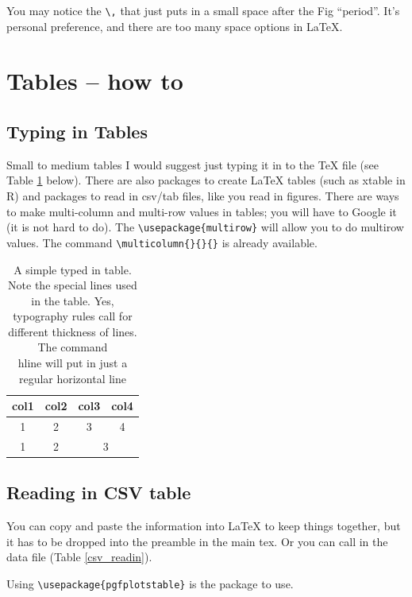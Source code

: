 You may notice the \verb+\,+ that just puts in a small space after the Fig ``period''. It's personal preference, and there are too many space options in \LaTeX{}. 


\section{Tables -- how to}

\subsection{Typing in Tables}
Small to medium tables I would suggest just typing it in to the \TeX{} file (see Table \ref{simpleTable} below). There are also packages to create \LaTeX{} tables (such as xtable in R) and packages to read in csv/tab files, like you read in figures. There are ways to make multi-column and multi-row values in tables; you will have to Google it (it is not hard to do). The \verb+\usepackage{multirow}+ will allow you to do multirow values. The command \verb+\multicolumn{}{}{}+ is already available. 

\begin{table}[h]
\centering
\caption[Simple table]{A simple typed in table. Note the special lines used in the table. Yes, typography rules call for different thickness of lines. The command \\hline will put in just a regular horizontal line}
\label{simpleTable}
\begin{tabular}{c|ccc} %
\toprule
col1 & col2 & col3 & col4 \\
\midrule
1 & 2 & 3 & 4 \\
1 & 2 & \multicolumn{2}{c}{3} \\
\bottomrule
\end{tabular}
\end{table}



\subsection{Reading in CSV table}

You can copy and paste the information into \LaTeX{} to keep things together, but it has to be dropped into the preamble in the main tex. Or you can call in the data file (Table \ref{csv_readin}).

Using \verb+\usepackage{pgfplotstable}+ is the package to use.

